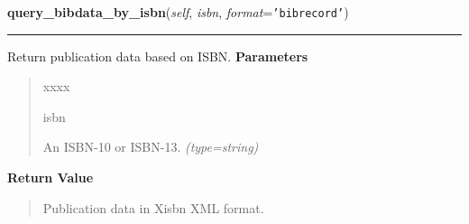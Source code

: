     \label{biblio:webquery:xisbn:XisbnQuery:query_bibdata_by_isbn}

    \vspace{0.5ex}

\hspace{.8\funcindent}\begin{boxedminipage}{\funcwidth}

    \raggedright \textbf{query\_bibdata\_by\_isbn}(\textit{self}, \textit{isbn}, \textit{format}={\tt \texttt{'}\texttt{bibrecord}\texttt{'}})

    \vspace{-1.5ex}

    \rule{\textwidth}{0.5\fboxrule}
\setlength{\parskip}{2ex}

Return publication data based on ISBN.
\setlength{\parskip}{1ex}
      \textbf{Parameters}
      \vspace{-1ex}

      \begin{quote}
        \begin{Ventry}{xxxx}

          \item[isbn]


An ISBN-10 or ISBN-13.
            {\it (type=string)}

        \end{Ventry}

      \end{quote}

      \textbf{Return Value}
    \vspace{-1ex}

      \begin{quote}

Publication data in Xisbn XML format.
      \end{quote}

    \end{boxedminipage}

    \label{biblio:webquery:xisbn:XisbnQuery:query_editions_by_isbn}

    \vspace{0.5ex}


